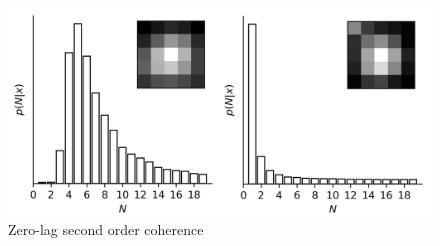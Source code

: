 \documentclass[a4paper, twocolumn, superscriptaddress,prl]{revtex4}  %
\begin{document}
\begin{figure}
\includegraphics[width=12cm]{Figure-4.png}
\caption{Zero-lag second order coherence}
\end{figure}  


\clearpage

 
\end{document}
